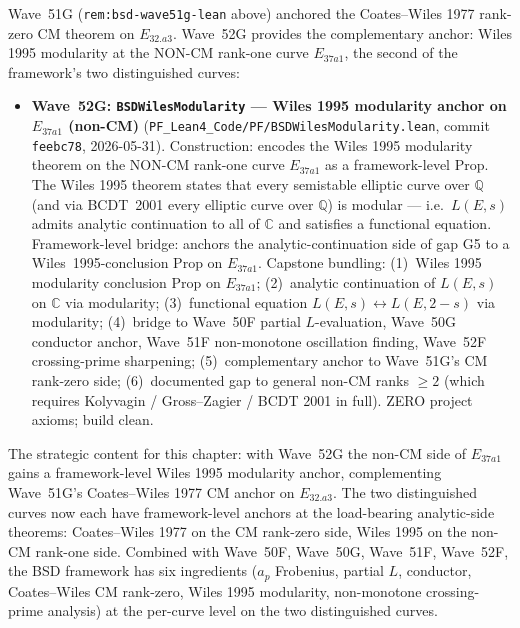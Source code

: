 \begin{remark}\label{rem:bsd-wave52g-lean}
Wave~51G (\texttt{rem:bsd-wave51g-lean} above) anchored the Coates--Wiles 1977 rank-zero CM theorem on $E_{32.a3}$. Wave~52G provides the complementary anchor: Wiles 1995 modularity at the NON-CM rank-one curve $E_{37a1}$, the second of the framework's two distinguished curves:
\begin{itemize}
  \item \textbf{Wave~52G: \texttt{BSDWilesModularity} --- Wiles 1995 modularity anchor on $E_{37a1}$ (non-CM)} (\texttt{PF\_Lean4\_Code/PF/BSDWilesModularity.lean}, commit \texttt{feebc78}, 2026-05-31). Construction: encodes the Wiles 1995 modularity theorem on the NON-CM rank-one curve $E_{37a1}$ as a framework-level Prop. The Wiles 1995 theorem states that every semistable elliptic curve over $\mathbb{Q}$ (and via BCDT~2001 every elliptic curve over $\mathbb{Q}$) is modular --- i.e.~$L(E, s)$ admits analytic continuation to all of $\mathbb{C}$ and satisfies a functional equation. Framework-level bridge: anchors the analytic-continuation side of gap G5 to a Wiles~1995-conclusion Prop on $E_{37a1}$. Capstone bundling: (1)~Wiles 1995 modularity conclusion Prop on $E_{37a1}$; (2)~analytic continuation of $L(E, s)$ on $\mathbb{C}$ via modularity; (3)~functional equation $L(E, s) \leftrightarrow L(E, 2 - s)$ via modularity; (4)~bridge to Wave~50F partial $L$-evaluation, Wave~50G conductor anchor, Wave~51F non-monotone oscillation finding, Wave~52F crossing-prime sharpening; (5)~complementary anchor to Wave~51G's CM rank-zero side; (6)~documented gap to general non-CM ranks $\geq 2$ (which requires Kolyvagin / Gross--Zagier / BCDT 2001 in full). ZERO project axioms; build clean.
\end{itemize}
The strategic content for this chapter: with Wave~52G the non-CM side of $E_{37a1}$ gains a framework-level Wiles 1995 modularity anchor, complementing Wave~51G's Coates--Wiles 1977 CM anchor on $E_{32.a3}$. The two distinguished curves now each have framework-level anchors at the load-bearing analytic-side theorems: Coates--Wiles 1977 on the CM rank-zero side, Wiles 1995 on the non-CM rank-one side. Combined with Wave~50F, Wave~50G, Wave~51F, Wave~52F, the BSD framework has six ingredients ($a_p$ Frobenius, partial $L$, conductor, Coates--Wiles CM rank-zero, Wiles 1995 modularity, non-monotone crossing-prime analysis) at the per-curve level on the two distinguished curves.


\end{remark}
